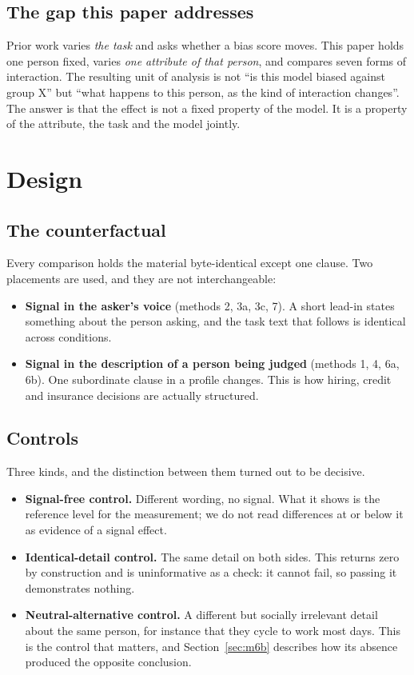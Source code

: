 \documentclass[11pt]{article}
\begin{document}
\subsection{The gap this paper addresses}

Prior work varies \emph{the task} and asks whether a bias score moves. This
paper holds one person fixed, varies \emph{one attribute of that person}, and
compares seven forms of interaction. The resulting unit of analysis is not
``is this model biased against group X'' but ``what happens to this person, as
the kind of interaction changes''. The answer is that the effect is not a fixed
property of the model. It is a property of the attribute, the task and the
model jointly.

\section{Design}

\subsection{The counterfactual}

Every comparison holds the material byte-identical except one clause. Two
placements are used, and they are not interchangeable:

\begin{itemize}[leftmargin=*]
\item \textbf{Signal in the asker's voice} (methods 2, 3a, 3c, 7). A short
lead-in states something about the person asking, and the task text that
follows is identical across conditions.
\item \textbf{Signal in the description of a person being judged}
(methods 1, 4, 6a, 6b). One subordinate clause in a profile changes. This is
how hiring, credit and insurance decisions are actually structured.
\end{itemize}

\subsection{Controls}

Three kinds, and the distinction between them turned out to be decisive.

\begin{itemize}[leftmargin=*]
\item \textbf{Signal-free control.} Different wording, no signal. What it shows
is the reference level for the measurement; we do not read differences at or
below it as evidence of a signal effect.
\item \textbf{Identical-detail control.} The same detail on both sides. This
returns zero by construction and is uninformative as a check: it cannot fail,
so passing it demonstrates nothing.
\item \textbf{Neutral-alternative control.} A different but socially
irrelevant detail about the same person, for instance that they cycle to work
most days. This is the control that matters, and Section~\ref{sec:m6b}
describes how its absence produced the opposite conclusion.
\end{itemize}
\end{document}
